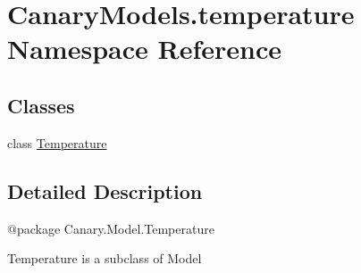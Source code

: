 \hypertarget{namespace_canary_models_1_1temperature}{\section{Canary\-Models.\-temperature Namespace Reference}
\label{namespace_canary_models_1_1temperature}
}
\subsection*{Classes}
\begin{DoxyCompactItemize}
\item 
class \hyperlink{class_canary_models_1_1temperature_1_1_temperature}{Temperature}
\end{DoxyCompactItemize}


\subsection{Detailed Description}
\begin{DoxyVerb}@package Canary.Model.Temperature

Temperature is a subclass of Model
\end{DoxyVerb}
 